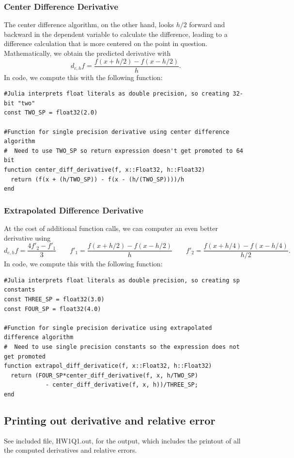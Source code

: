 \documentclass{article}
\begin{document}
\subsubsection{Center Difference Derivative}
The center difference algorithm, on the other hand, looks $h/2$ forward and backward in the dependent variable to calculate the difference, leading to a difference calculation that is more centered on the point in question. Mathematically, we obtain the predicted derivative with
$$d_{c,h}f =\frac{f(x+h/2) - f(x-h/2)}{h}.$$
In code, we compute this with the following function:
\begin{lstlisting}
#Julia interprets float literals as double precision, so creating 32-bit "two"
const TWO_SP = float32(2.0)

#Function for single precision derivative using center difference algorithm
#  Need to use TWO_SP so return expression doesn't get promoted to 64 bit
function center_diff_derivative(f, x::Float32, h::Float32)
  return (f(x + (h/TWO_SP)) - f(x - (h/(TWO_SP))))/h
end
\end{lstlisting}

\subsubsection{Extrapolated Difference Derivative}
At the cost of additional function calls, we can computer an even better derivative using
$$d_{e,h}f = \frac{4f'_2 - f'_1}{3} \qquad f'_1 = \frac{f(x+h/2) - f(x-h/2)}{h} \qquad f'_2 = \frac{f(x+h/4) - f(x-h/4)}{h/2}.$$
In code, we compute this with the following function:
\begin{lstlisting}
#Julia interprets float literals as double precision, so creating sp constants
const THREE_SP = float32(3.0)
const FOUR_SP = float32(4.0)

#Function for single precision derivatice using extrapolated difference algorithm
#  Need to use single precision constants so the expression does not get promoted
function extrapol_diff_derivatice(f, x::Float32, h::Float32)
  return (FOUR_SP*center_diff_derivative(f, x, h/TWO_SP)
            - center_diff_derivative(f, x, h))/THREE_SP;
end
\end{lstlisting}
\subsection{Printing out derivative and relative error}
See included file, HW1Q1.out, for the output, which includes the printout of all the computed derivatives and relative errors.
\end{document}
